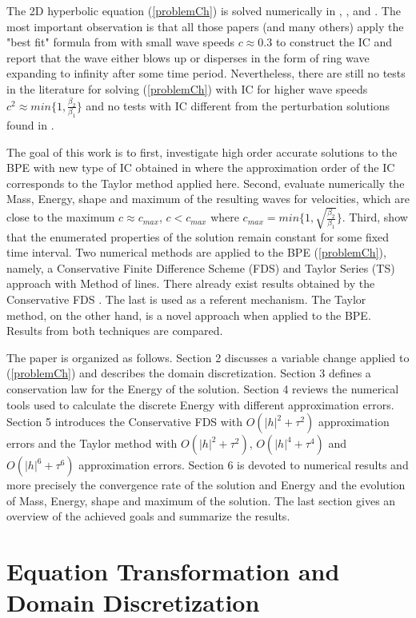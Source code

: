 \documentclass[%
 aip,
cp,  %
 amsmath,amssymb,%
 reprint,%
]{revtex4-2}
\newcommand{\rf}[1]{(\ref{#1})}
\begin{document}
The 2D hyperbolic equation \rf{problemCh} is solved numerically in \cite{ref20}, \cite{ref21}, \cite{ref22} and \cite{ref23}. The most important observation is that all those papers (and many others) apply the "best fit" formula from \cite{ref15} with small wave speeds $c \approx 0.3$ to construct the IC and report that the wave either blows up or disperses in the form of ring wave expanding to infinity after some time period. Nevertheless, there are still no tests in the literature for solving \rf{problemCh} with IC for higher wave speeds $c^2 \approx min\{1, \frac{\beta_2}{\beta_1} \}$ and no tests with IC different from the perturbation solutions found in \cite{ref15}.

The goal of this work is to first, investigate high order accurate solutions to the BPE with new type of IC obtained in \cite{ref16} where the approximation order of the IC corresponds to the Taylor method applied here. Second, evaluate numerically the Mass, Energy, shape and maximum of the resulting waves for velocities, which are close to the maximum $c \approx c_{max}$, $c < c_{max}$ where $c_{max} = min\{1, \sqrt{ \frac{\beta_2}{\beta_1} } \}$. Third, show that the enumerated properties of the solution remain constant for some fixed time interval. Two numerical methods are applied to the BPE \rf{problemCh}, namely, a Conservative Finite Difference Scheme (FDS) and Taylor Series (TS) approach with Method of lines. There already exist results obtained by the Conservative FDS \cite{ref20}. The last is used as a referent mechanism. The Taylor method, on the other hand, is a novel approach when applied to the BPE. Results from both techniques are compared. 

The paper is organized as follows. Section 2 discusses a variable change applied to \rf{problemCh} and describes the domain discretization. Section 3 defines a conservation law for the Energy of the solution. Section 4 reviews the numerical tools used to calculate the discrete Energy with different approximation errors. Section 5 introduces the Conservative FDS with $O(|h|^2 + \tau^2)$ approximation errors and the Taylor method with $O(|h|^2 + \tau^2)$, $O(|h|^4 + \tau^4)$ and $O(|h|^6 + \tau^6)$ approximation errors. Section 6 is devoted to numerical results and more precisely the convergence rate of the solution and Energy and the evolution of Mass, Energy, shape and maximum of the solution. The last section gives an overview of the achieved goals and summarize the results.

\section{Equation Transformation and Domain Discretization}
\end{document}
